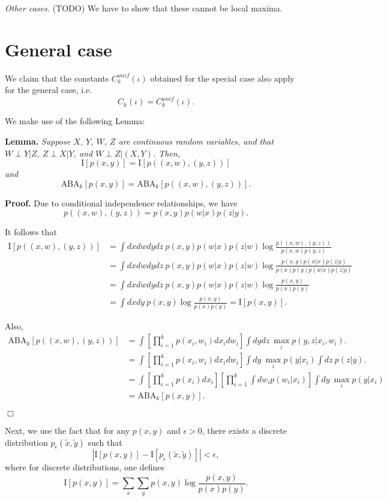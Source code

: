 \documentclass[12pt]{article}
\begin{document}
\emph{Other cases.}   (TODO) We have to show that these cannot be local maxima.



\section{General case}

We claim that the constants $C_k^{unif}(\iota)$ obtained for the special case also apply for the general case, i.e.
\[
C_k(\iota) = C_k^{unif}(\iota).
\]

We make use of the following Lemma:

\textbf{Lemma.} \emph{
Suppose $X$, $Y$, $W$, $Z$ are continuous random variables, and that $W\perp Y|Z$, $Z \perp X|Y$, and $W \perp Z|(X,Y)$.
Then,
\[
\text{I}[p(x, y)] = \text{I}[p((x,w), (y,z))]
\]
and
\[
\text{ABA}_k[p(x, y)] = \text{ABA}_k[p((x,w), (y,z))].
\]
}

\textbf{Proof.}
Due to conditional independence relationships, we have
\[
p((x,w), (y,z)) = p(x,y)p(w|x)p(z|y).
\]

It follows that
\begin{align*}
\text{I}[p((x,w), (y,z))] &= \int dx dw dy dz  \ p(x,y)p(w|x)p(z|w) \log \frac{p((x,w), (y,z))}{p(x,w)p(y,z)}
\\&= \int dx dw dy dz \ p(x,y)p(w|x)p(z|w) \log \frac{p(x, y)p(w|x)p(z|y)}{p(x)p(y)p(w|x)p(z|y)}
\\&= \int dx dw dy dz \ p(x,y)p(w|x)p(z|w) \log \frac{p(x, y)}{p(x)p(y)}
\\&= \int dx dy \ p(x,y) \log \frac{p(x, y)}{p(x)p(y)} = \text{I}[p(x,y)].
\end{align*}

Also,
\begin{align*}
\text{ABA}_k[p((x,w),(y,z))] 
&= \int \left[\prod_{i=1}^k p(x_i, w_i) dx_i dw_i \right] \int dy dz \ \max_i p(y,z|x_i, w_i).
\\&= \int \left[\prod_{i=1}^k p(x_i, w_i) dx_i dw_i \right] \int dy \ \max_i p(y|x_i) \int dz \ p(z|y).
\\&= \int \left[\prod_{i=1}^k p(x_i) dx_i \right] \left[\prod_{i=1}^k \int dw_i p(w_i|x_i)\right] \int dy \ \max_i p(y|x_i)
\\&= \text{ABA}_k[p(x,y)].
\end{align*}

$\Box$

Next, we use the fact that for any $p(x,y)$ and $\epsilon > 0$, there exists a discrete distribution $p_\epsilon(\tilde{x}, \tilde{y})$ such that
\[
|\text{I}[p(x,y)] - \text{I}[p_\epsilon(\tilde{x}, \tilde{y})]| < \epsilon,
\]
where for discrete distributions, one defines
\[
\text{I}[p(x,y)] = \sum_x \sum_y p(x,y) \log \frac{p(x,y)}{p(x)p(y)}.
\]
\end{document}
